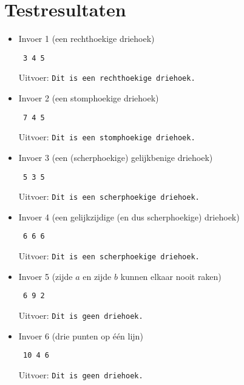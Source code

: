 \documentclass[a4paper,10pt]{article}
\begin{document}
\section{Testresultaten}
\begin{itemize}
 \item Invoer 1 (een rechthoekige driehoek)
\begin{lstlisting}
 3 4 5
\end{lstlisting}
Uitvoer: {\tt Dit is een rechthoekige driehoek.}
\\
\item Invoer 2 (een stomphoekige driehoek)
\begin{lstlisting}
 7 4 5
\end{lstlisting}
Uitvoer: {\tt Dit is een stomphoekige driehoek.}
\\
\item Invoer 3 (een (scherphoekige) gelijkbenige driehoek)
\begin{lstlisting}
 5 3 5
\end{lstlisting}
Uitvoer: {\tt Dit is een scherphoekige driehoek.}
\\
\item Invoer 4 (een gelijkzijdige (en dus scherphoekige) driehoek)
\begin{lstlisting}
 6 6 6
\end{lstlisting}
Uitvoer: {\tt Dit is een scherphoekige driehoek.}
\\
\item Invoer 5 (zijde $a$ en zijde $b$ kunnen elkaar nooit raken)
\begin{lstlisting}
 6 9 2
\end{lstlisting}
Uitvoer: {\tt Dit is geen driehoek.}
\\
\item Invoer 6 (drie punten op \'e\'en lijn)
\begin{lstlisting}
 10 4 6
\end{lstlisting}
Uitvoer: {\tt Dit is geen driehoek.}

\end{itemize}

\newpage


\end{document}
